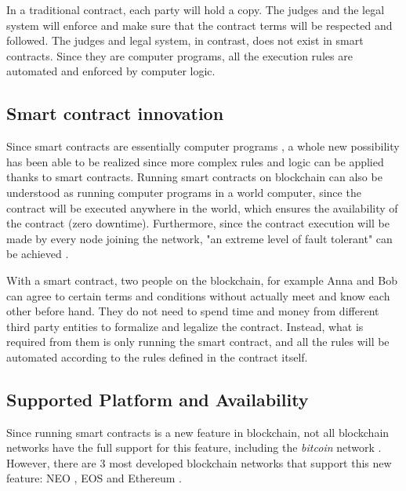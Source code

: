 \documentclass[twoside,numperchapter]{tutthesis} %
\begin{document}
In a traditional contract, each party will hold a copy. The judges and the legal system will enforce and make sure that the contract terms will be respected and followed. The judges and legal system, in contrast, does not exist in smart contracts. Since they are computer programs, all the execution rules are automated and enforced by computer logic.

\subsection{Smart contract innovation}

Since smart contracts are essentially computer programs \citep{Ethdocorg:EVM}, a whole new possibility has been able to be realized since more complex rules and logic can be applied thanks to smart contracts. Running smart contracts on blockchain can also be understood as running computer programs in a world computer, since the contract will be executed anywhere in the world, which ensures the availability of the contract (zero downtime). Furthermore, since the contract execution will be made by every node joining the network, "an extreme level of fault tolerant" can be achieved \citep{Ethdocorg:EVM}.

With a smart contract, two people on the blockchain, for example Anna and Bob can agree to certain terms and conditions without actually meet and know each other before hand. They do not need to spend time and money from different third party entities to formalize and legalize the contract. Instead, what is required from them is only running the smart contract, and all the rules will be automated according to the rules defined in the contract itself.

\subsection{Supported Platform and Availability}

Since running smart contracts is a new feature in blockchain, not all blockchain networks have the full support for this feature, including the \textit{bitcoin} network \citep{BitcoinSmartContract}. However, there are 3 most developed blockchain networks that support this new feature: NEO \citep{NEO}, EOS \citep{EOS} and Ethereum \citep{Ethereum}.
\end{document}
